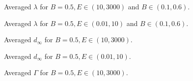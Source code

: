 \documentclass{beamer}
\begin{document}

\begin{frame}
	\begin{figure}
		
		\caption{Averaged \(\lambda\) for \(B=0.5, E \in (10, 3000)\)
		and \(B \in (0.1, 0.6)\).}
	\end{figure}
\end{frame}


\begin{frame}
	\begin{figure}
		
		\caption{Averaged \(\lambda\) for \(B=0.5, E \in (0.01, 10)\)
		and \(B \in (0.1, 0.6)\).}
	\end{figure}
\end{frame}


\begin{frame}
	\begin{figure}
		
		\caption{Averaged \(d_\infty\) for \(B=0.5, E \in (10, 3000)\).}
	\end{figure}
\end{frame}


\begin{frame}
	\begin{figure}
		
		\caption{Averaged \(d_\infty\) for \(B=0.5, E \in (0.01, 10)\).}
	\end{figure}
\end{frame}


\begin{frame}
	\begin{figure}
		
		\caption{Averaged \(\Gamma\) for \(B=0.5, E \in (10, 3000)\).}
	\end{figure}
\end{frame}

\end{document}
